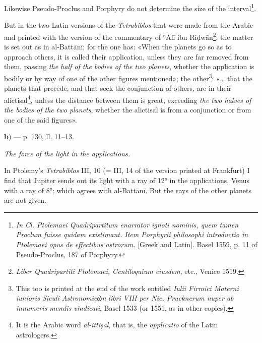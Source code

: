 \documentclass[11pt]{article}
\begin{document}
\par Likewise Pseudo-Proclus and Porphyry do not determine the size of the interval\footnote{\emph{In Cl. Ptolemaei Quadripartitum enarrator ignoti nominis, quem tamen Proclum fuisse quidam existimant. Item Porphyrii philosophi introductio in Ptolemaei opus de effectibus astrorum.} [Greek and Latin]. Basel 1559, p. 11 of Pseudo-Proclus, 187 of Porphyry.}.\par
\par But in the two Latin versions of the \emph{Tetrabiblos} that were made from the Arabic and printed with the version of the commentary of ʿAlī ibn Riḍwān\footnote{\emph{Liber Quadripartiti Ptolemaei, Centiloquium eiusdem}, etc., Venice 1519.}, the matter is set out as in al-Battānī; for the one has: «When the planets go so as to approach others, it is called their application, unless they are far removed from them, passing \emph{the half of the bodies of the two planets}, whether the application is bodily or by way of one of the other figures mentioned»; the other\footnote{This too is printed at the end of the work entitled \emph{Iulii Firmici Materni iunioris Siculi Astronomic{\greekfont ῶ}n libri VIII per Nic. Prucknerum nuper ab innumeris mendis vindicati}, Basel 1533 (or 1551, as in other copies).}: «… that the planets that precede, and that seek the conjunction of others, are in their alictisal\footnote{It is the Arabic word \emph{al-ittiṣāl}, that is, the \emph{applicatio} of the Latin astrologers.}, unless the distance between them is great, exceeding \emph{the two halves of the bodies of the two planets}, whether the alictisal is from a conjunction or from one of the said figures».\par
\par\begin{center}\textbf{b}) — p. 130, ll. 11–13.\end{center}
\par \emph{The force of the light in the applications.}\par
\par In Ptolemy's \emph{Tetrabiblos} III, 10 (= III, 14 of the version printed at Frankfurt) I find that Jupiter sends out its light with a ray of 12° in the applications, Venus with a ray of 8°; which agrees with al-Battānī. But the rays of the other planets are not given.\par
\end{document}
